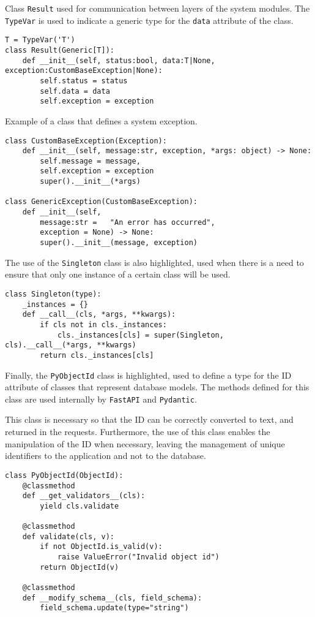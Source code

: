 Class \texttt{Result} used for communication between layers of the system modules. The \texttt{TypeVar} is used to indicate a generic type for the \texttt{data} attribute of the class.

\begin{Verbatim}[fontsize=\small, baselinestretch=0.6]
T = TypeVar('T')
class Result(Generic[T]):
    def __init__(self, status:bool, data:T|None, exception:CustomBaseException|None):
        self.status = status
        self.data = data
        self.exception = exception
\end{Verbatim}

Example of a class that defines a system exception.

\begin{Verbatim}[fontsize=\small, baselinestretch=0.6]
class CustomBaseException(Exception):
    def __init__(self, message:str, exception, *args: object) -> None:
        self.message = message,
        self.exception = exception
        super().__init__(*args)

class GenericException(CustomBaseException):
    def __init__(self,
        message:str =   "An error has occurred",
        exception = None) -> None:
        super().__init__(message, exception)
\end{Verbatim}


The use of the \texttt{Singleton} class is also highlighted, used when there is a need to ensure that only one instance of a certain class will be used.

\begin{Verbatim}[fontsize=\small, baselinestretch=0.6]
class Singleton(type):
    _instances = {}
    def __call__(cls, *args, **kwargs):
        if cls not in cls._instances:
            cls._instances[cls] = super(Singleton, cls).__call__(*args, **kwargs)
        return cls._instances[cls]
\end{Verbatim}

Finally, the \texttt{PyObjectId} class is highlighted, used to define a type for the ID attribute of classes that represent database models. The methods defined for this class are used internally by \texttt{FastAPI} and \texttt{Pydantic}.

This class is necessary so that the ID can be correctly converted to text, and returned in the requests. Furthermore, the use of this class enables the manipulation of the ID when necessary, leaving the management of unique identifiers to the application and not to the database.

\begin{Verbatim}[fontsize=\small, baselinestretch=0.6]
class PyObjectId(ObjectId):
    @classmethod
    def __get_validators__(cls):
        yield cls.validate

    @classmethod
    def validate(cls, v):
        if not ObjectId.is_valid(v):
            raise ValueError("Invalid object id")
        return ObjectId(v)

    @classmethod
    def __modify_schema__(cls, field_schema):
        field_schema.update(type="string")
\end{Verbatim}

